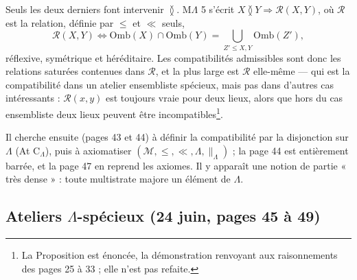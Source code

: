 \documentclass[11pt,a4paper]{article}
\begin{document}
Seuls les deux derniers font intervenir $\between$. M$\Lambda$ 5 s'écrit $X
\between Y \Rightarrow \mathcal{R}(X, Y)$, où $\mathcal{R}$ est la relation,
définie par $\leq$ et $\ll$ seuls,
\[
\mathcal{R}(X, Y) \iff \mathrm{Omb}(X) \cap \mathrm{Omb}(Y) = \bigcup_{Z' \leq X,
Y} \mathrm{Omb}(Z') ,
\]
réflexive, symétrique et héréditaire. Les compatibilités admissibles sont donc les
relations saturées contenues dans $\mathcal{R}$, et la plus large est
$\mathcal{R}$ elle-même --- qui est la compatibilité dans un atelier ensembliste
spécieux, mais pas dans d'autres cas intéressants : $\mathcal{R}(x, y)$ est
toujours vraie pour deux lieux, alors que hors du cas ensembliste deux lieux
peuvent être incompatibles\footnote{La Proposition est énoncée, la démonstration
renvoyant aux raisonnements des pages 25 à 33 ; elle n'est pas refaite.}.

Il cherche ensuite (pages 43 et 44) à définir la compatibilité par la disjonction
sur $\Lambda$ (At C$_{\Lambda}$), puis à axiomatiser $(\mathcal{M}, \leq, \ll,
\Lambda, \parallel_{\Lambda})$ ; la page 44 est entièrement barrée, et la page 47
en reprend les axiomes. Il y apparaît une notion de partie « très dense » : toute
multistrate majore un élément de $\Lambda$.

\subsection*{Ateliers $\Lambda$-spécieux (24 juin, pages 45 à 49)}
\end{document}
